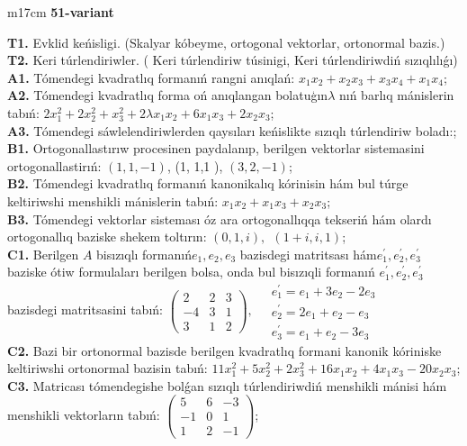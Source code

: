 \documentclass{article}
\begin{document}
\begin{tabular}{m{17cm}}
\textbf{51-variant}
\newline

\textbf{T1.} Evklid keńisligi. (Skalyar kóbeyme, ortogonal vektorlar, ortonormal bazis.) \\
\textbf{T2.} Keri túrlendiriwler. ( Keri túrlendiriw túsinigi,   Keri túrlendiriwdiń sızıqlılıǵı) \\
\textbf{A1.} Tómendegi kvadratlıq formanıń rangni anıqlań: \(x_{1}x_{2} + x_{2}x_{3} + x_{3}x_{4} + x_{1}x_{4}\); \\
\textbf{A2.} Tómendegi kvadratlıq forma oń anıqlangan bolatuģın\(\lambda\) nıń barlıq mánislerin tabıń: \(2x_{1}^{2} + 2x_{2}^{2} + x_{3}^{2} + 2\lambda x_{1}x_{2} + 6x_{1}x_{3} + 2x_{2}x_{3}\); \\
\textbf{A3.} Tómendegi sáwlelendiriwlerden qaysıları keńislikte sızıqlı túrlendiriw boladı:; \\
\textbf{B1.} Ortogonallastırıw procesinen paydalanıp, berilgen vektorlar sistemasini ortogonallastirıń: \((1,1, - 1)\), (1, 1,1 ), \((3,2, - 1)\); \\
\textbf{B2.} Tómendegi kvadratlıq formanıń kanonikalıq kórinisin hám bul túrge keltiriwshi menshikli mánislerin tabıń: \(x_{1}x_{2} + x_{1}x_{3} + x_{2}x_{3}\); \\
\textbf{B3.} Tómendegi vektorlar sisteması óz ara ortogonallıqqa tekseriń hám olardı ortogonallıq baziske shekem toltırın: \((0,1,i),\ \ (1 + i,i,1)\); \\
\textbf{C1.} Berilgen \(A\) bisızıqlı formanıń\(e_{1},e_{2},e_{3}\) bazisdegi matritsası hám\(e_{1}^{'},e_{2}^{'},e_{3}^{'}\) baziske ótiw formulaları berilgen bolsa, onda bul bisızıqli formanıń \(e_{1}^{'},e_{2}^{'},e_{3}^{'}\) bazisdegi matritsasini tabıń: \(\begin{pmatrix} 2 & 2 & 3 \\  - 4 & 3 & 1 \\ 3 & 1 & 2 \end{pmatrix},\ \begin{matrix}  & e_{1}^{'} = e_{1} + 3e_{2} - 2e_{3} \\  & e_{2}^{'} = 2e_{1} + e_{2} - e_{3} \\  & e_{3}^{'} = e_{1} + e_{2} - 3e_{3} \end{matrix}\) \\
\textbf{C2.} Bazi bir ortonormal bazisde berilgen kvadratlıq formani kanonik kóriniske keltiriwshi ortonormal bazisin tabıń: \(11x_{1}^{2} + 5x_{2}^{2} + 2x_{3}^{2} + 16x_{1}x_{2} + 4x_{1}x_{3} - 20x_{2}x_{3}\); \\
\textbf{C3.} Matricası tómendegishe bolǵan sızıqlı túrlendiriwdiń menshikli mánisi hám menshikli vektorların tabıń: \(\begin{pmatrix} 5 & 6 & - 3 \\  - 1 & 0 & 1 \\ 1 & 2 & - 1 \end{pmatrix}\); \\

\end{tabular}
\vspace{1cm}
\end{document}
